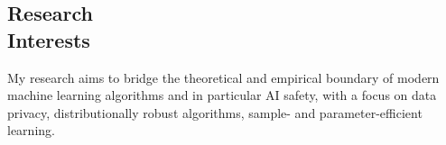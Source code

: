 \documentclass[margin, 10pt]{res} %
\begin{document}
\begin{resume}

 







\section{Research\\ Interests}
My research aims to bridge the theoretical and empirical boundary of modern machine learning algorithms and in particular AI safety, with a focus on data privacy, distributionally robust algorithms, sample- and parameter-efficient learning. 


\end{resume}
\end{document}
